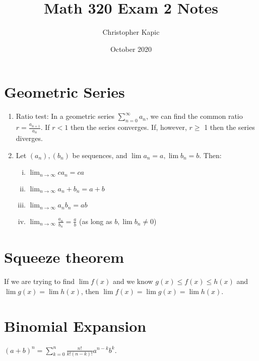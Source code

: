 \documentclass{article}
\title{Math 320 Exam 2 Notes}
\author{Christopher Kapic}
\date{October 2020}
\begin{document}
\maketitle

\section*{Geometric Series}
\begin{enumerate}
    \item Ratio test: In a geometric series $\sum _{n=0}^\infty a_n$, we can find the common ratio $r = \frac{a_{n+1}}{a_n}$. If $r < 1$ then the series converges. If, however, $r \geq$ 1 then the series diverges.
    \item Let $(a_n), (b_n)$ be sequences, and $\lim a_n = a, \lim b_n = b$. Then:
        \begin{enumerate}[(i)]
            \item $\lim _{n\rightarrow\infty} c a_n = ca$
            \item $\lim _{n\rightarrow\infty} a_n + b_n = a+b$
            \item $\lim _{n\rightarrow\infty} a_nb_n = ab$
            \item $\lim _{n\rightarrow\infty} \frac{a_n}{b_n}=\frac{a}{b}$ (as long as $b, \lim b_n \neq 0$)
        \end{enumerate}
\end{enumerate}

\section*{Squeeze theorem}
If we are trying to find $\lim f(x)$ and we know $g(x)\leq f(x) \leq h(x)$ and $\lim g(x)=\lim h(x)$, then $\lim f(x)=\lim g(x)=\lim h(x).$


\section*{Binomial Expansion}
$(a+b)^n=\sum _{k=0}^n\frac{n!}{k!(n-k)!}a^{n-k}b^k$.
\end{document}
